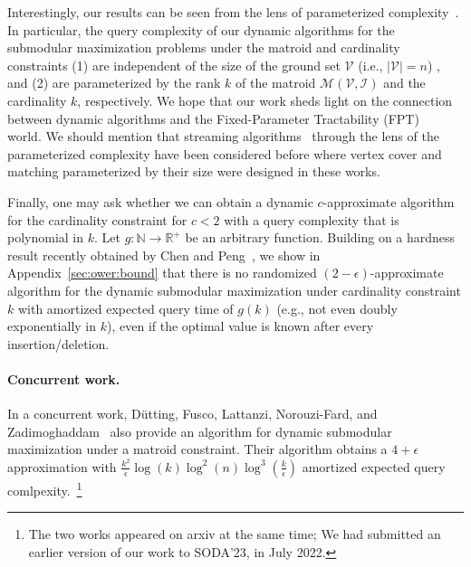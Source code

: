 \documentclass[11pt]{article}
\newcommand{\matroid}{\mathcal{M}(\ground,\mathcal{I})}
\newcommand{\ground}{\ensuremath{\mathcal{V}}}
\begin{document}
Interestingly, our results can be seen from the lens of parameterized complexity~\cite{marx2008parameterized,fomin2021fast,DBLP:conf/focs/Korhonen21,KT11,DBLP:conf/mfcs/FafianieK14,DBLP:conf/soda/ChitnisCEHMMV16,DBLP:conf/soda/ChitnisCHM15,doi:10.1137/15M1032077,10.5555/3174304.3175483}. 
In particular, the query complexity of our dynamic algorithms for the submodular maximization problems under the matroid and cardinality 
constraints  (1) are independent of the size of the ground set $\ground$ (i.e., $|\ground| = n$) 
, and 
(2) are parameterized by the rank $k$ of the matroid $\matroid$ and the cardinality $k$, respectively. 
We hope that our work sheds light on the connection between dynamic algorithms  
and the Fixed-Parameter Tractability (FPT)~\cite{10.5555/2464827, DBLP:series/txtcs/FlumG06,cygan2015parameterized} world. 
We should mention that streaming algorithms~\cite{DBLP:conf/mfcs/FafianieK14,DBLP:conf/soda/ChitnisCEHMMV16,DBLP:conf/soda/ChitnisCHM15} through the lens of the parameterized complexity have been considered before 
where vertex cover and matching parameterized by their size were designed in these works. 


Finally, one may ask whether we can obtain a dynamic $c$-approximate algorithm for the cardinality constraint 
for $c < 2$ with a  query complexity that is polynomial in $k$. 
Let $g: \mathbb{N} \to \mathbb{R}^+$ be an arbitrary function.
Building on a hardness result recently obtained by Chen 
and Peng~\cite{DBLP:journals/corr/abs-2111-03198}, 
we show in Appendix~\ref{sec:ower:bound} 
that there is no randomized $(2-\epsilon)$-approximate algorithm for the dynamic submodular maximization under cardinality constraint $k$ 
with amortized expected query time of $g(k)$ (e.g., not even doubly exponentially in $k$), 
even if the optimal value is known after every insertion/deletion.



\paragraph{Concurrent work.}
In a concurrent work, 
Dütting, Fusco, Lattanzi, Norouzi-Fard, and Zadimoghaddam~\cite{dutting2023fully} also provide an algorithm for
dynamic submodular maximization under a matroid constraint. Their algorithm
obtains a
$4+\epsilon$ approximation with $\frac{k^2}{\epsilon}\log(k)\log^2(n)\log^3(\frac{k}{\epsilon})$ amortized expected query comlpexity.~\footnote{The two works appeared on arxiv at the same time;
We had
submitted 
an earlier version of our work to
SODA'23, in July 2022.
}
\end{document}
